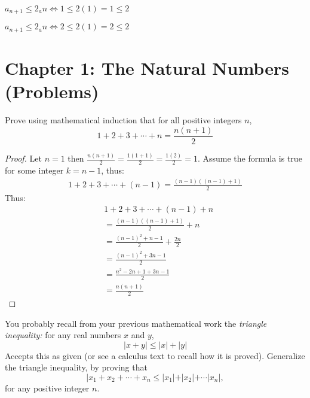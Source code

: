 \documentclass[8pt]{article}
\begin{document}

$a_{n + 1} \le 2_an \iff 1 \le 2(1) = 1 \le 2$

$a_{n + 1} \le 2_an \iff 2 \le 2(1) = 2 \le 2$

\section{Chapter 1: The Natural Numbers (Problems)}

\begin{tcolorbox}[title=Problem 1, breakable]
    Prove using mathematical induction that for all positive integers $n$,
    \[1 + 2 + 3 + \cdots + n = \frac{n(n + 1)}{2}\]
\end{tcolorbox}

\begin{proof}
    Let $n = 1$ then $\frac{n(n + 1)}{2} = \frac{1(1 + 1)}{2} = \frac{1(2)}{2} = 1$.
    Assume the formula is true for some integer $k = n - 1$, thus:
    \begin{align*}
        1 + 2 + 3 + \cdots + (n - 1) = \frac{(n - 1)((n - 1) + 1)}{2}
    \end{align*}
    Thus:
    \begin{align*}
         & 1 + 2 + 3 + \cdots + (n - 1) + n               \\
         & = \frac{(n - 1)((n - 1) + 1)}{2} + n           \\
         & = \frac{{(n - 1)}^2 + n - 1}{2} + \frac{2n}{2} \\
         & = \frac{{(n - 1)}^2 + 3n - 1}{2}               \\
         & = \frac{n^2 - 2n + 1 + 3n - 1}{2}              \\
         & = \frac{n(n + 1)}{2}
    \end{align*}
\end{proof}

\begin{tcolorbox}[title=Problem 3, breakable]
    You probably recall from your previous mathematical work the \emph{triangle inequality:}
    for any real numbers $x$ and $y$,
    \[|x + y| \le |x| + |y|\]
    Accepts this as given (or see a calculus text to recall how it is proved).
    Generalize the triangle inequality, by proving that 
    \[|x_1 + x_2 + \cdots + x_n \le |x_1| + |x_2| + \cdots |x_n|,\]
    for any positive integer $n$.
\end{tcolorbox}
\end{document}
